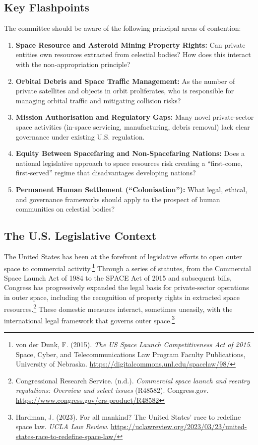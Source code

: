 \subsection{Key Flashpoints}

The committee should be aware of the following principal areas of contention:

\begin{enumerate}
  \item \textbf{Space Resource and Asteroid Mining Property Rights:} Can private entities own resources extracted from celestial bodies? How does this interact with the non-appropriation principle?
  \item \textbf{Orbital Debris and Space Traffic Management:} As the number of private satellites and objects in orbit proliferates, who is responsible for managing orbital traffic and mitigating collision risks?
  \item \textbf{Mission Authorisation and Regulatory Gaps:} Many novel private-sector space activities (in-space servicing, manufacturing, debris removal) lack clear governance under existing U.S. regulation.
  \item \textbf{Equity Between Spacefaring and Non-Spacefaring Nations:} Does a national legislative approach to space resources risk creating a “first-come, first-served” regime that disadvantages developing nations?
  \item \textbf{Permanent Human Settlement (“Colonisation”):} What legal, ethical, and governance frameworks should apply to the prospect of human communities on celestial bodies?
\end{enumerate}

\subsection{The U.S. Legislative Context}

The United States has been at the forefront of legislative efforts to open outer space to commercial activity.\footnote{von der Dunk, F. (2015). \emph{The US Space Launch Competitiveness Act of 2015}. Space, Cyber, and Telecommunications Law Program Faculty Publications, University of Nebraska. \url{https://digitalcommons.unl.edu/spacelaw/98/}} Through a series of statutes, from the Commercial Space Launch Act of 1984 to the SPACE Act of 2015 and subsequent bills, Congress has progressively expanded the legal basis for private-sector operations in outer space, including the recognition of property rights in extracted space resources.\footnote{Congressional Research Service. (n.d.). \emph{Commercial space launch and reentry regulations: Overview and select issues} (R48582). Congress.gov. \url{https://www.congress.gov/crs-product/R48582}} These domestic measures interact, sometimes uneasily, with the international legal framework that governs outer space.\footnote{Hardman, J. (2023). For all mankind? The United States' race to redefine space law. \emph{UCLA Law Review}. \url{https://uclawreview.org/2023/03/23/united-states-race-to-redefine-space-law/}}
